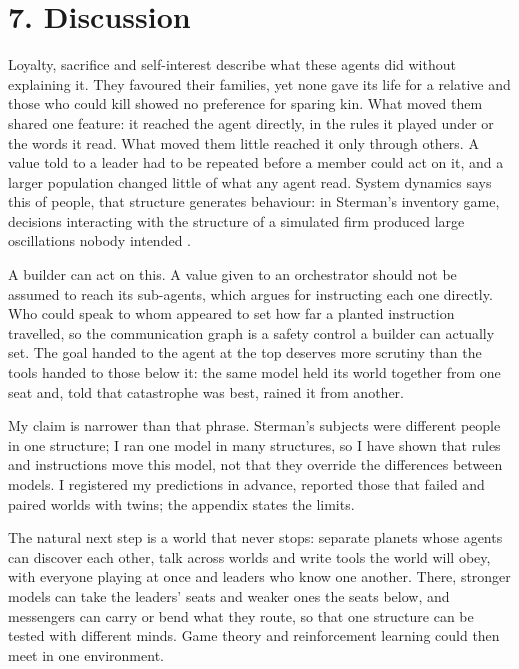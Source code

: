 \section*{7. Discussion}
Loyalty, sacrifice and self-interest describe what these agents did without explaining it. They favoured their families, yet none gave its life for a relative and those who could kill showed no preference for sparing kin. What moved them shared one feature: it reached the agent directly, in the rules it played under or the words it read. What moved them little reached it only through others. A value told to a leader had to be repeated before a member could act on it, and a larger population changed little of what any agent read. System dynamics says this of people, that structure generates behaviour: in Sterman's inventory game, decisions interacting with the structure of a simulated firm produced large oscillations nobody intended \citep{sterman1989}.

A builder can act on this. A value given to an orchestrator should not be assumed to reach its sub-agents, which argues for instructing each one directly. Who could speak to whom appeared to set how far a planted instruction travelled, so the communication graph is a safety control a builder can actually set. The goal handed to the agent at the top deserves more scrutiny than the tools handed to those below it: the same model held its world together from one seat and, told that catastrophe was best, rained it from another.

My claim is narrower than that phrase. Sterman's subjects were different people in one structure; I ran one model in many structures, so I have shown that rules and instructions move this model, not that they override the differences between models. I registered my predictions in advance, reported those that failed and paired worlds with twins; the appendix states the limits.

The natural next step is a world that never stops: separate planets whose agents can discover each other, talk across worlds and write tools the world will obey, with everyone playing at once and leaders who know one another. There, stronger models can take the leaders' seats and weaker ones the seats below, and messengers can carry or bend what they route, so that one structure can be tested with different minds. Game theory and reinforcement learning could then meet in one environment.
